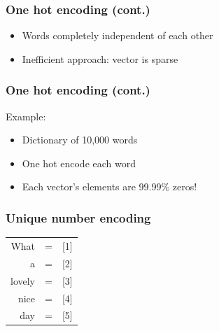 
\begin{frame}
\frametitle{One hot encoding (cont.)}

	\begin{itemize}
		\item Words completely independent of each other
		\item Inefficient approach: vector is sparse
	\end{itemize}

\end{frame}



\begin{frame}
\frametitle{One hot encoding (cont.)}

	Example:
	\begin{itemize}
		\item Dictionary of 10,000 words
		\item One hot encode each word
		\item Each vector's elements are 99.99\% zeros!
		
	\end{itemize}

\end{frame}



\begin{frame}
\frametitle{Unique number encoding}

\begin{table}[h]
	\hspace{15mm}
	\huge
	\begin{tabular}{rcl}
		What & = & [1] \\
		a & = & [2]\\
		lovely & = & [3]\\
		nice & = & [4]\\
		day & = & [5]\\
	\end{tabular}
\end{table}


\end{frame}

